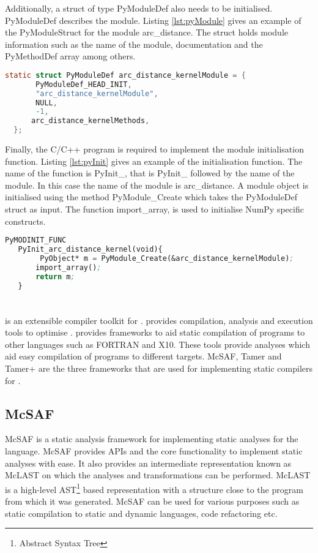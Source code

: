 Additionally, a struct of type PyModuleDef also needs to be initialised. PyModuleDef describes the module. Listing \ref{lst:pyModule} gives an example of the PyModuleStruct for the module arc\_distance. The struct holds module information such as the name of the module, documentation and the PyMethodDef array among others.
\begin{lstlisting}[language=C, label={lst:pyModule}, caption={Example of the PyModuleDef struct}]
 static struct PyModuleDef arc_distance_kernelModule = {
       PyModuleDef_HEAD_INIT,
       "arc_distance_kernelModule",
       NULL,
       -1,
      arc_distance_kernelMethods,
  };
\end{lstlisting}

 Finally, the C/C++ program is required to implement the module initialisation function. Listing \ref{lst:pyInit} gives an example of the initialisation function. The name of the function is PyInit\_<module name>, that is \textsf{PyInit\_} followed by the name of the module. In this case the name of the module is arc\_distance. A module object is initialised using the method PyModule\_Create which takes the PyModuleDef struct as input. The function import\_array, is used to initialise NumPy specific constructs. 
\begin{lstlisting}[language=lisp, label={lst:pyInit}, caption={Example of the module initialisation function for the module arc\_distance}]
 PyMODINIT_FUNC
   PyInit_arc_distance_kernel(void){
        PyObject* m = PyModule_Create(&arc_distance_kernelModule);
       import_array();
       return m;
   }

\end{lstlisting}
\section{\mclab}
\mclab is an extensible compiler toolkit for \matlab. \mclab provides compilation, analysis and execution tools to optimise \matlab. \mclab provides frameworks to aid static compilation of \matlab programs to other languages such as FORTRAN and X10. These tools provide analyses which aid easy compilation of \matlab programs to different targets. McSAF, Tamer and Tamer+ are the three frameworks that are used for implementing static compilers for \matlab. 
\subsection{McSAF}
McSAF is a static analysis framework for implementing static analyses for the \matlab language. McSAF provides APIs and the core functionality to implement static analyses with ease. It also provides an intermediate representation known as McLAST on which the analyses and transformations can be performed. McLAST is a high-level AST\footnote{Abstract Syntax Tree} based representation with a structure close to the \matlab program from which it was generated. McSAF can be used for various purposes such as static compilation to static and dynamic languages, code refactoring etc. 

